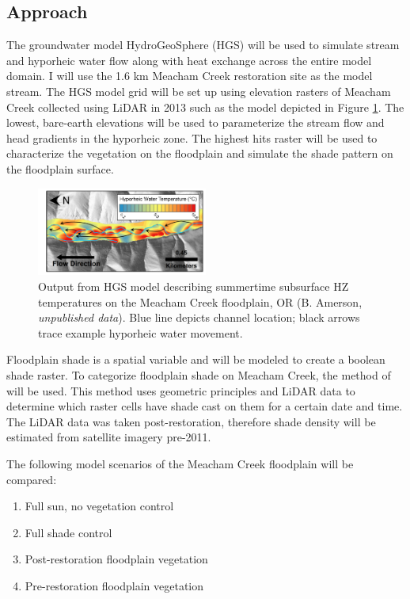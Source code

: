 \documentclass[a4paper]{article}
\begin{document}
\subsection*{Approach}
The groundwater model HydroGeoSphere (HGS) will be used to simulate stream and hyporheic water flow along with heat exchange across the entire model domain. I will use the 1.6 km Meacham Creek restoration site as the model stream. The HGS model grid will be set up using elevation rasters of Meacham Creek collected using LiDAR in 2013 such as the model depicted in Figure \ref{fig:Three}. The lowest, bare-earth elevations will be used to parameterize the stream flow and head gradients in the hyporheic zone. The highest hits raster will be used to characterize the vegetation on the floodplain and simulate the shade pattern on the floodplain surface. 

\begin{figure}
\centering
\includegraphics[width=0.5\textwidth]{HyporheicModel.png}
\caption{\label{fig:Three} Output from HGS model describing summertime subsurface HZ temperatures on the Meacham Creek floodplain, OR (B. Amerson, \textit{unpublished data}). Blue line depicts channel location; black arrows trace example hyporheic water movement.}
\end{figure}


Floodplain shade is a spatial variable and will be modeled to create a boolean shade raster. To categorize floodplain shade on Meacham Creek, the method of \cite{Loicq2018ImprovingData} will be used. This method uses geometric principles and LiDAR data to determine which raster cells have shade cast on them for a certain date and time. The LiDAR data was taken post-restoration, therefore shade density will be estimated from satellite imagery pre-2011.

The following model scenarios of the Meacham Creek floodplain will be compared: 
\begin{enumerate}
    \item Full sun, no vegetation control
    \item Full shade control
    \item Post-restoration floodplain vegetation
    \item Pre-restoration floodplain vegetation
\end{enumerate}
\end{document}
